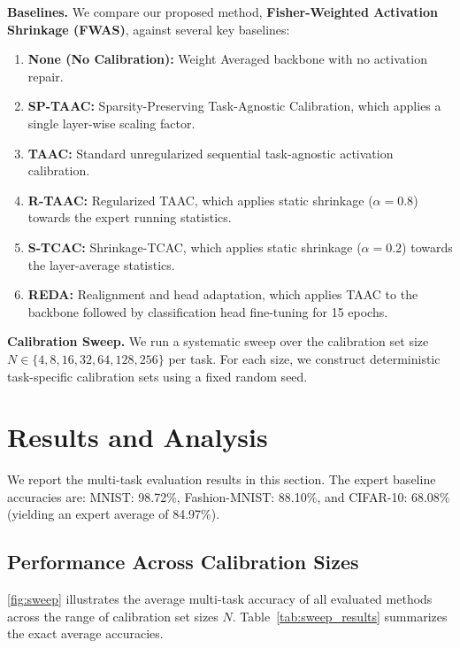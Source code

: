 \documentclass{article}
\theoremstyle{plain}
\theoremstyle{definition}
\theoremstyle{remark}
\begin{document}
\textbf{Baselines.} We compare our proposed method, \textbf{Fisher-Weighted Activation Shrinkage (FWAS)}, against several key baselines:
\begin{enumerate}
    \item \textbf{None (No Calibration):} Weight Averaged backbone with no activation repair.
    \item \textbf{SP-TAAC:} Sparsity-Preserving Task-Agnostic Calibration, which applies a single layer-wise scaling factor.
    \item \textbf{TAAC:} Standard unregularized sequential task-agnostic activation calibration.
    \item \textbf{R-TAAC:} Regularized TAAC, which applies static shrinkage ($\alpha = 0.8$) towards the expert running statistics.
    \item \textbf{S-TCAC:} Shrinkage-TCAC, which applies static shrinkage ($\alpha = 0.2$) towards the layer-average statistics.
    \item \textbf{REDA:} Realignment and head adaptation, which applies TAAC to the backbone followed by classification head fine-tuning for 15 epochs.
\end{enumerate}

\textbf{Calibration Sweep.} We run a systematic sweep over the calibration set size $N \in \{4, 8, 16, 32, 64, 128, 256\}$ per task. For each size, we construct deterministic task-specific calibration sets using a fixed random seed.

\section{Results and Analysis}
\label{sec:results}

We report the multi-task evaluation results in this section. The expert baseline accuracies are: MNIST: 98.72\%, Fashion-MNIST: 88.10\%, and CIFAR-10: 68.08\% (yielding an expert average of 84.97\%).

\subsection{Performance Across Calibration Sizes}

\cref{fig:sweep} illustrates the average multi-task accuracy of all evaluated methods across the range of calibration set sizes $N$. Table~\ref{tab:sweep_results} summarizes the exact average accuracies.
\end{document}
